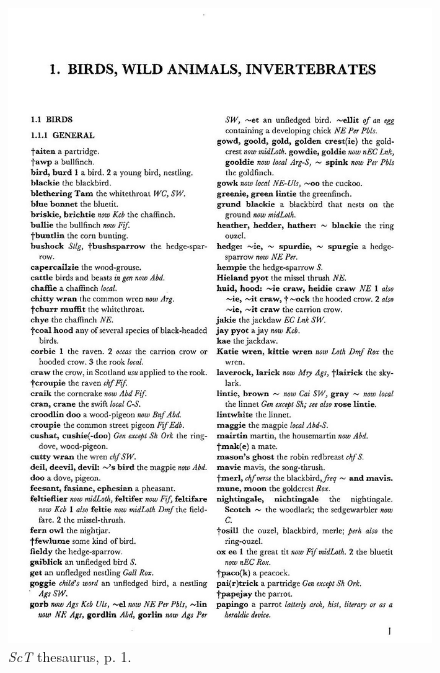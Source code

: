\begin{figure}[htbp]
  \centering
    \includegraphics[width=\linewidth]{Stolk_thes-content/fig/thes/ScT-p001.jpg}
  \caption{\textit{ScT} thesaurus, p. 1.}
  \label{fig:1.A:ScT:thesaurus}
\end{figure}

